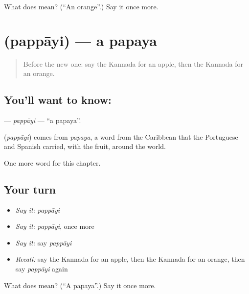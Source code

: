 \begin{tcolorbox}[breakable,colback=teal!4,colframe=teal!35!black,title={Before you move on}]
What does  mean? (\textquotedblleft{}An orange\textquotedblright{}.) Say it once more.
\end{tcolorbox}
\section[\texorpdfstring{\kn{ಪಪ್ಪಾಯಿ} (pappāyi)}{ಪಪ್ಪಾಯಿ (pappāyi)}]{ (pappāyi) — a papaya}

\label{lesson:KA-C221-pappayi}



\begin{quote}
Before the new one: say the Kannada for an apple, then the Kannada for an orange.
\end{quote}

\subsection*{You'll want to know: }
\textbf{} — \emph{pappāyi} — \textquotedblleft{}a papaya\textquotedblright{}.

\begin{cousinweb}
\textbf{} (\emph{pappāyi}) comes from \emph{papaya}, a word from the Caribbean that the Portuguese and Spanish carried, with the fruit, around the world.
\end{cousinweb}

\begin{grammarlens}[title={What you've built}]
One more word for this chapter.
\end{grammarlens}

\subsection*{Your turn}
\begin{itemize}
\raggedright
  \item \emph{Say it:} \emph{pappāyi}
  \item \emph{Say it:} \emph{pappāyi}, once more
  \item \emph{Say it:} say \emph{pappāyi}
  \item \emph{Recall:} say the Kannada for an apple, then the Kannada for an orange, then say \emph{pappāyi} again
\end{itemize}

\begin{tcolorbox}[breakable,colback=teal!4,colframe=teal!35!black,title={Before you move on}]
What does  mean? (\textquotedblleft{}A papaya\textquotedblright{}.) Say it once more.
\end{tcolorbox}
